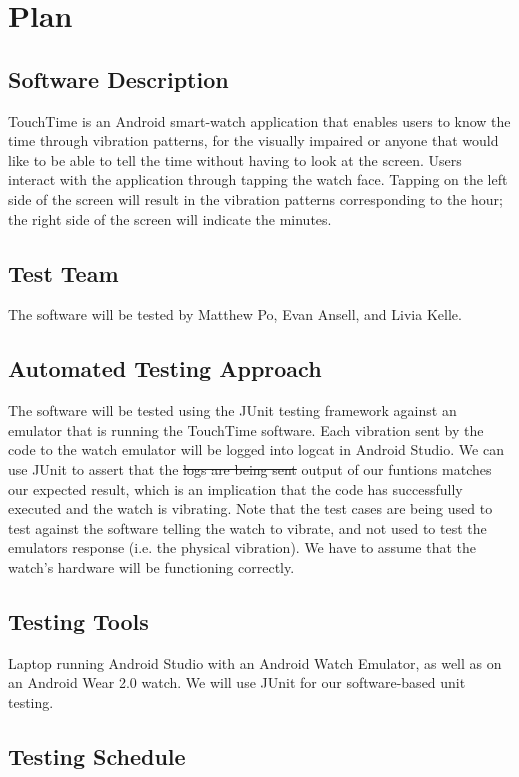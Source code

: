 \section{Plan}
	
\subsection{Software Description}
TouchTime is an Android smart-watch application that enables users to know the time through vibration patterns, for the visually impaired or anyone that would like to be able to tell the time without having to look at the screen. Users interact with the application through tapping the watch face. Tapping on the left side of the screen will result in the vibration patterns corresponding to the hour; the right side of the screen will indicate the minutes.


\subsection{Test Team}
The software will be tested by Matthew Po, Evan Ansell, and Livia Kelle. 

\subsection{Automated Testing Approach}
The software will be tested using the JUnit testing framework against an emulator that is running the TouchTime software. Each vibration sent by the code to the watch emulator will be logged into logcat in Android Studio. We can use JUnit to assert that the \sout{logs are being sent} output of our funtions matches our expected result, which is an implication that the code has successfully executed and the watch is vibrating. Note that the test cases are being used to test against the software telling the watch to vibrate, and not used to test the emulators response (i.e. the physical vibration). We have to assume that the watch's hardware will be functioning correctly.

\subsection{Testing Tools}
Laptop running Android Studio with an Android Watch Emulator, as well as on an Android Wear 2.0 watch.
We will use JUnit for our software-based unit testing.

\subsection{Testing Schedule}
		
